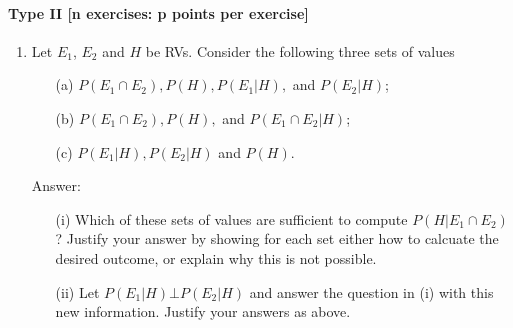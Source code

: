 \documentclass{article}
\begin{document}
\begin{enumerate}
\end{enumerate}		

\paragraph{Type II [n exercises: p points per exercise]}
\begin{enumerate}
	\item Let $E_1$, $E_2$ and $H$ be RVs. Consider the following three sets of values
		    \begin{itemize}
			    \item[(a)] $P(E_1 \cap E_2), P(H), P(E_1 |H),$ and $P(E_2|H)$;
			    \item[(b)] $P(E_1 \cap E_2), P(H),$ and $P(E_1 \cap E_2|H)$;
			    \item[(c)] $P(E_1|H), P(E_2|H)$ and $P(H)$.
		    \end{itemize}

    Answer:
    \begin{itemize}
	    \item[(i)] Which of these sets of values are sufficient to compute $P(H|E_1 \cap E_2)$? 		    Justify your answer by showing for each set either how to calcuate the desired outcome, or explain why this is not possible.
	    \item[(ii)] Let $P(E_1|H) \bot P(E_2|H)$ and answer the question in (i) with this new information. Justify your answers as above.
    \end{itemize}
\end{enumerate}
\end{document}
